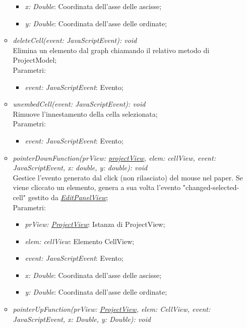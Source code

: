 \documentclass[../DefinizioneDiProdotto.tex]{subfiles}
\begin{document}
\begin{itemize}
\begin{itemize}
\begin{itemize}
								\item \emph{x: Double}: Coordinata dell'asse delle ascisse;
								\item \emph{y: Double}: Coordinata dell'asse delle ordinate;
							\end{itemize}
							\item \emph{deleteCell(event: JavaScriptEvent): void} \\
							Elimina un elemento dal graph chiamando il relativo metodo di ProjectModel;\\
							Parametri:
							\begin{itemize}
								\item \emph{event: JavaScriptEvent}: Evento;
							\end{itemize}
							\item \emph{unembedCell(event: JavaScriptEvent): void} \\
							Rimuove l'innestamento della cella selezionata;\\
							Parametri:
							\begin{itemize}
								\item \emph{event: JavaScriptEvent}: Evento;
							\end{itemize}
							\item \emph{pointerDownFunction(prView: \hyperlink{SWEDesigner::Client::View::projectView}{\emph{projectView}}, elem: cellView, event: JavaScriptEvent, x: double, y: double): void} \\
							Gestice l'evento generato dal click (non rilasciato) del mouse nel paper. Se viene cliccato un elemento, genera a sua volta l'evento "changed-selected-cell" gestito da \hyperlink{SWEDesigner::Client::View::EditPanelView}{\emph{EditPanelView}};\\
							Parametri:
							\begin{itemize}
								\item \emph{prView: \hyperlink{SWEDesigner::Client::View::ProjectView}{\emph{ProjectView}}}: Istanza di ProjectView;
								\item \emph{elem: cellView}: Elemento CellView;
								\item \emph{event: JavaScriptEvent}: Evento;
								\item \emph{x: Double}: Coordinata dell'asse delle ascisse;
								\item \emph{y: Double}: Coordinata dell'asse delle ordinate;
							\end{itemize}
							\item \emph{pointerUpFunction(prView: \hyperlink{SWEDesigner::Client::View::ProjectView}{\emph{ProjectView}}, elem: CellView, event: JavaScriptEvent, x: Double, y: Double): void} \\

\end{itemize}
\end{itemize}
\end{document}
